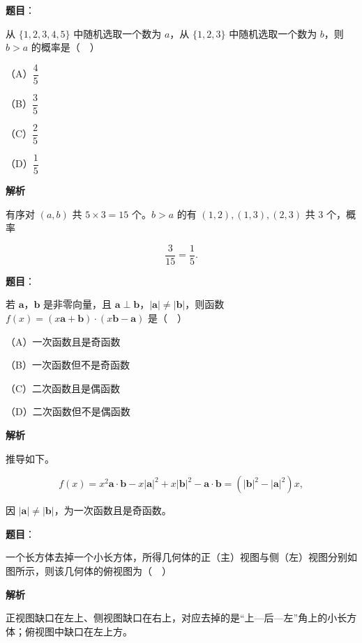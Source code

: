 \begin{answer}

\textbf{题目}：

从 $\{1,2,3,4,5\}$ 中随机选取一个数为 $a$，从 $\{1,2,3\}$ 中随机选取一个数为 $b$，则 $b>a$ 的概率是（　）

（A）$\dfrac45$

（B）$\dfrac35$

（C）$\dfrac25$

（D）$\dfrac15$

\textbf{解析}

有序对 $(a,b)$ 共 $5\times3=15$ 个。$b>a$ 的有 $(1,2),(1,3),(2,3)$ 共 $3$ 个，概率

\nopagebreak[4]
\[\frac3{15}=\frac15.\]


\end{answer}
\begin{answer}

\textbf{题目}：

若 $\boldsymbol a$，$\boldsymbol b$ 是非零向量，且 $\boldsymbol a\perp\boldsymbol b$，$|\boldsymbol a|\neq|\boldsymbol b|$，则函数 $f(x)=(x\boldsymbol a+\boldsymbol b)\cdot(x\boldsymbol b-\boldsymbol a)$ 是（　）

（A）一次函数且是奇函数

（B）一次函数但不是奇函数

（C）二次函数且是偶函数

（D）二次函数但不是偶函数

\textbf{解析}

推导如下。

\nopagebreak[4]
\[f(x)=x^2\boldsymbol a\cdot\boldsymbol b-x|\boldsymbol a|^2+x|\boldsymbol b|^2-\boldsymbol a\cdot\boldsymbol b
=(|\boldsymbol b|^2-|\boldsymbol a|^2)x,\]

因 $|\boldsymbol a|\neq|\boldsymbol b|$，为一次函数且是奇函数。


\end{answer}
\begin{answer}

\textbf{题目}：

一个长方体去掉一个小长方体，所得几何体的正（主）视图与侧（左）视图分别如图所示，则该几何体的俯视图为（　）
\nopagebreak[4]
\begin{center}\end{center}
\nopagebreak[4]
\textbf{解析}

正视图缺口在左上、侧视图缺口在右上，对应去掉的是“上—后—左”角上的小长方体；俯视图中缺口在左上方。


\end{answer}

